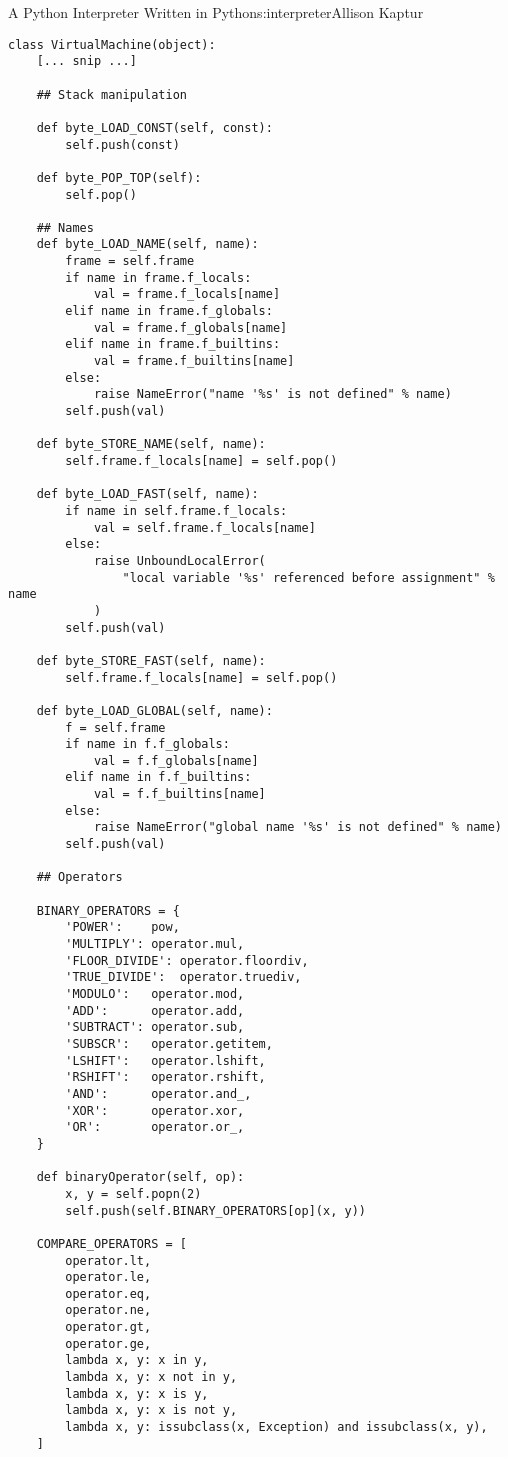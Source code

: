 \begin{aosachapter}{A Python Interpreter Written in Python}{s:interpreter}{Allison Kaptur}
\begin{verbatim}
class VirtualMachine(object):
    [... snip ...]

    ## Stack manipulation

    def byte_LOAD_CONST(self, const):
        self.push(const)

    def byte_POP_TOP(self):
        self.pop()

    ## Names
    def byte_LOAD_NAME(self, name):
        frame = self.frame
        if name in frame.f_locals:
            val = frame.f_locals[name]
        elif name in frame.f_globals:
            val = frame.f_globals[name]
        elif name in frame.f_builtins:
            val = frame.f_builtins[name]
        else:
            raise NameError("name '%s' is not defined" % name)
        self.push(val)

    def byte_STORE_NAME(self, name):
        self.frame.f_locals[name] = self.pop()

    def byte_LOAD_FAST(self, name):
        if name in self.frame.f_locals:
            val = self.frame.f_locals[name]
        else:
            raise UnboundLocalError(
                "local variable '%s' referenced before assignment" % name
            )
        self.push(val)

    def byte_STORE_FAST(self, name):
        self.frame.f_locals[name] = self.pop()

    def byte_LOAD_GLOBAL(self, name):
        f = self.frame
        if name in f.f_globals:
            val = f.f_globals[name]
        elif name in f.f_builtins:
            val = f.f_builtins[name]
        else:
            raise NameError("global name '%s' is not defined" % name)
        self.push(val)

    ## Operators

    BINARY_OPERATORS = {
        'POWER':    pow,
        'MULTIPLY': operator.mul,
        'FLOOR_DIVIDE': operator.floordiv,
        'TRUE_DIVIDE':  operator.truediv,
        'MODULO':   operator.mod,
        'ADD':      operator.add,
        'SUBTRACT': operator.sub,
        'SUBSCR':   operator.getitem,
        'LSHIFT':   operator.lshift,
        'RSHIFT':   operator.rshift,
        'AND':      operator.and_,
        'XOR':      operator.xor,
        'OR':       operator.or_,
    }

    def binaryOperator(self, op):
        x, y = self.popn(2)
        self.push(self.BINARY_OPERATORS[op](x, y))

    COMPARE_OPERATORS = [
        operator.lt,
        operator.le,
        operator.eq,
        operator.ne,
        operator.gt,
        operator.ge,
        lambda x, y: x in y,
        lambda x, y: x not in y,
        lambda x, y: x is y,
        lambda x, y: x is not y,
        lambda x, y: issubclass(x, Exception) and issubclass(x, y),
    ]


\end{verbatim}
\end{aosachapter}
